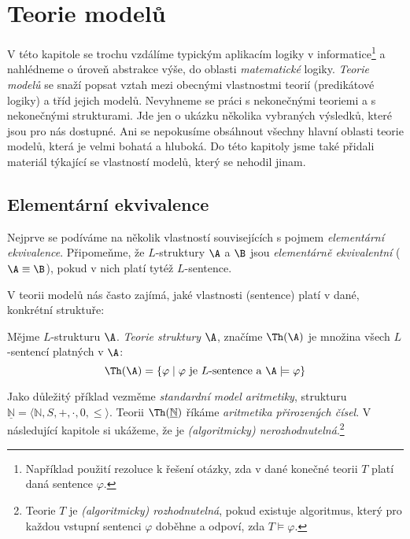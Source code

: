 \chapter{Teorie modelů}\label{chapter:model-theory}

V této kapitole se trochu vzdálíme typickým aplikacím logiky v informatice\footnote{Například použití rezoluce k řešení otázky, zda v dané konečné teorii $T$ platí daná sentence $\varphi$.} a nahlédneme o úroveň abstrakce výše, do oblasti \emph{matematické} logiky. \emph{Teorie modelů} se snaží popsat vztah mezi obecnými vlastnostmi teorií (predikátové logiky) a tříd jejich modelů. Nevyhneme se práci s nekonečnými teoriemi a s nekonečnými strukturami. Jde jen o ukázku několika vybraných výsledků, které jsou pro nás dostupné. Ani se nepokusíme obsáhnout všechny hlavní oblasti teorie modelů, která je velmi bohatá a hluboká. Do této kapitoly jsme také přidali materiál týkající se vlastností modelů, který se nehodil jinam.


\section{Elementární ekvivalence}

Nejprve se podíváme na několik vlastností souvisejících s pojmem \emph{elementární ekvivalence}. Připomeňme, že $L$-struktury $\A$ a $\B$ jsou \emph{elementárně ekvivalentní} ($\A\equiv \B$), pokud v nich platí tytéž $L$-sentence.

V teorii modelů nás často zajímá, jaké vlastnosti (sentence) platí v dané, konkrétní struktuře:

\begin{definition}
Mějme $L$-strukturu $\A$. \emph{Teorie struktury} $\A$, značíme $\Th(\A)$ je množina všech $L$-sentencí platných v $\A$:
$$
\Th(\A)=\{\varphi\mid\varphi\text{ je $L$-sentence a }\A\models\varphi\}
$$
\end{definition}

\begin{example}
Jako důležitý příklad vezměme \emph{standardní model aritmetiky}, strukturu $\underline{\mathbb{N}}=\langle\mathbb{N},S,+,\cdot,0,\le\rangle$. Teorii $\Th(\underline{\mathbb{N}})$ říkáme \emph{aritmetika přirozených čísel}. V následující kapitole si ukážeme, že je \emph{(algoritmicky) nerozhodnutelná}.\footnote{Teorie $T$ je \emph{(algoritmicky) rozhodnutelná}, pokud existuje algoritmus, který pro každou vstupní sentenci $\varphi$ doběhne a odpoví, zda $T\models\varphi$.}
\end{example}

